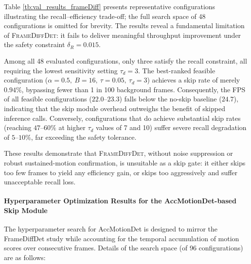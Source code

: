\documentclass[
  10pt,
]{article}
\begin{document}


Table \ref{tb:val_results_frameDiff} presents representative
configurations illustrating the recall--efficiency trade-off; the full
search space of 48 configurations is omitted for brevity. The results
reveal a fundamental limitation of \textsc{FrameDiffDet}: it fails to
deliver meaningful throughput improvement under the safety constraint
\(\delta_R = 0.015\).

Among all 48 evaluated configurations, only three satisfy the recall
constraint, all requiring the lowest sensitivity setting \(\tau_d = 3\).
The best-ranked feasible configuration
(\(\alpha{=}0.5,\ B{=}16,\ \tau{=}0.05,\ \tau_d{=}3\)) achieves a skip
rate of merely \(0.94\%\), bypassing fewer than 1 in 100 background
frames. Consequently, the FPS of all feasible configurations
(\(22.0\)--\(23.3\)) falls below the no-skip baseline (\(24.7\)),
indicating that the skip module overhead outweighs the benefit of
skipped inference calls. Conversely, configurations that do achieve
substantial skip rates (reaching \(47\)--\(60\%\) at higher \(\tau_d\)
values of 7 and 10) suffer severe recall degradation of \(5\)--\(10\%\),
far exceeding the safety tolerance.

These results demonstrate that \textsc{FrameDiffDet}, without noise
suppression or robust sustained-motion confirmation, is unsuitable as a
skip gate: it either skips too few frames to yield any efficiency gain,
or skips too aggressively and suffer unacceptable recall loss.

\paragraph{Hyperparameter Optimization Results for the
AccMotionDet-based Skip
Module}\label{hyperparameter-optimization-results-for-the-accmotiondet-based-skip-module}



The hyperparameter search for AccMotionDet is designed to mirror the
FrameDiffDet study while accounting for the temporal accumulation of
motion scores over consecutive frames. Details of the search space (of
96 configurations) are as follows:
\end{document}
